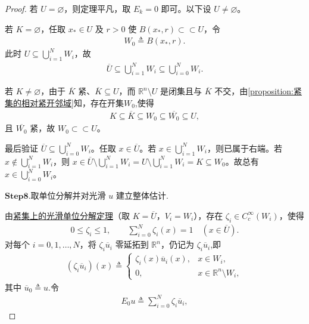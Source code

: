 \documentclass[../../main.tex]{subfiles}
\begin{document}
\begin{proof}
若 $U=\varnothing$，则定理平凡，取 $E_k=0$ 即可。以下设 $U\neq\varnothing$。

若 $K=\varnothing$，任取 $x_*\in U$ 及 $r>0$ 使 $B(x_*,r)\subset\subset U$，令
\begin{align*}
W_0\triangleq B(x_*,r).
\end{align*}
此时 $U\subseteq\bigcup_{i=1}^{N}W_i$，故
\begin{align*}
\overline{U}\subseteq\bigcup_{i=1}^{N}W_i\subseteq\bigcup_{i=0}^{N}W_i.
\end{align*}

若 $K\neq\varnothing$，由于 $\overline{K}$ 紧、$\overline{K}\subseteq U$，而 $\mathbb{R}^{n}\setminus U$ 是闭集且与 $\overline{K}$ 不交，由\cref{proposition:紧集的相对紧开邻域}知，存在开集$W_0$,使得
\begin{align*}
K\subseteq\overline{K}\subseteq W_0\subseteq\overline{W_0}\subseteq U,
\end{align*}
且 $\overline{W_0}$ 紧，故 $W_0\subset\subset U$。

最后验证 $\overline{U}\subseteq\bigcup_{i=0}^{N}W_i$。任取 $x\in\overline{U}$。若 $x\in\bigcup_{i=1}^{N}W_i$，则已属于右端。若 $x\notin\bigcup_{i=1}^{N}W_i$，则 $x\in\overline{U}\setminus\bigcup_{i=1}^{N}W_i=U\setminus\bigcup_{i=1}^{N}W_i=K\subseteq W_0$。故总有 $x\in\bigcup_{i=0}^{N}W_i$。

\noindent$\mathbf{Step}\bm{8}$.{\heiti 取单位分解并对光滑 $u$ 建立整体估计.}

由\hyperref[corollary:紧集上的光滑单位分解定理]{紧集上的光滑单位分解定理}（取 $K=\overline{U}$，$V_i=W_i$），存在 $\zeta_i\in C_c^{\infty}(W_i)$，使得
\begin{align*}
0\leqslant\zeta_i\leqslant1,\qquad
\sum_{i=0}^{N}\zeta_i(x)=1\quad(x\in\overline{U}).
\end{align*}
对每个 $i=0,1,\dots,N$，将 $\zeta_i\overline{u}_i$ 零延拓到 $\mathbb{R}^n$，仍记为 $\zeta_i\overline{u}_i$,即
\begin{align*}
(\zeta_i\overline{u}_i)(x)\triangleq
\begin{cases}
\zeta_i(x)\overline{u}_i(x), & x\in W_i,\\[2mm]
0, & x\in\mathbb{R}^n\setminus W_i,
\end{cases}
\end{align*}
其中 $\overline{u}_0\triangleq u$.令
\begin{align*}
E_0u\triangleq\sum_{i=0}^{N}\zeta_i\overline{u}_i,
\end{align*}


\end{proof}
\end{document}
